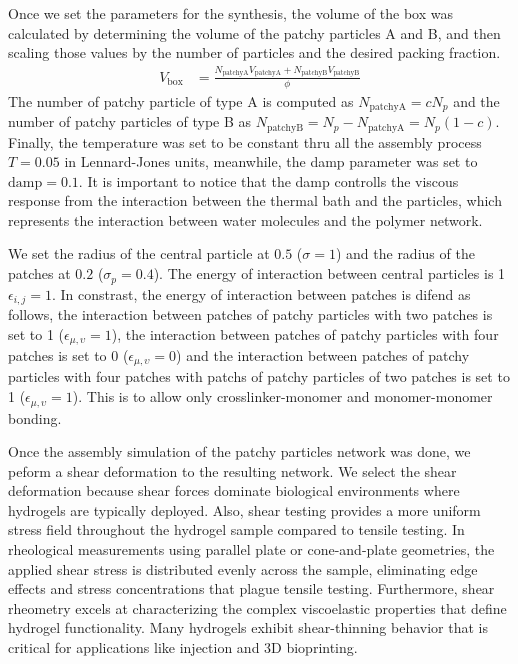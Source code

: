 Once we set the parameters for the synthesis, the volume of the box was calculated by determining the volume of the patchy particles A and B, and then scaling those values by the number of particles and the desired packing fraction.
\begin{align*}
    V_{\mathrm{box}} &= \frac{N_{\mathrm{patchyA}}V_{\mathrm{patchyA}}+N_{\mathrm{patchyB}}V_{\mathrm{patchyB}}}{\phi}
\end{align*}
The number of patchy particle of type A is computed as $N_{\mathrm{patchyA}} = c N_p$ and the number of patchy particles of type B as $N_{\mathrm{patchyB}}= N_p - N_{\mathrm{patchyA}}= N_p(1 - c )$.
Finally, the temperature was set to be constant thru all the assembly process $T=0.05$ in Lennard-Jones units, meanwhile, the damp parameter was set to $\mathrm{damp}=0.1$.
It is important to notice that the damp controlls the viscous response from the interaction between the thermal bath and the particles, which represents the interaction between water molecules and the polymer network.

We set the radius of the central particle at $0.5$ ($\sigma=1$) and the radius of the patches at $0.2$ ($\sigma_p=0.4$).
The energy of interaction between central particles is 1 $\epsilon_{i,j}=1$.
In constrast, the energy of interaction between patches is difend as follows,
the interaction between patches of patchy particles with two patches is set to 1 ($\epsilon_{\mu,\upsilon}=1$), 
the interaction between patches of patchy particles with four patches is set to \num{0} ($\epsilon_{\mu,\upsilon}=0$) 
and the interaction between patches of patchy particles with four patches with patchs of patchy particles of two patches is set to \num{1} ($\epsilon_{\mu,\upsilon}=1$).
This is to allow only crosslinker-monomer and monomer-monomer bonding.


Once the assembly simulation of the patchy particles network was done, we peform a shear deformation to the resulting network.
We select the shear deformation because shear forces dominate biological environments where hydrogels are typically deployed. 
Also, shear testing provides a more uniform stress field throughout the hydrogel sample compared to tensile testing. 
In rheological measurements using parallel plate or cone-and-plate geometries, the applied shear stress is distributed evenly across the sample, eliminating edge effects and stress concentrations that plague tensile testing.
Furthermore, shear rheometry excels at characterizing the complex viscoelastic properties that define hydrogel functionality.
Many hydrogels exhibit shear-thinning behavior that is critical for applications like injection and 3D bioprinting. 

